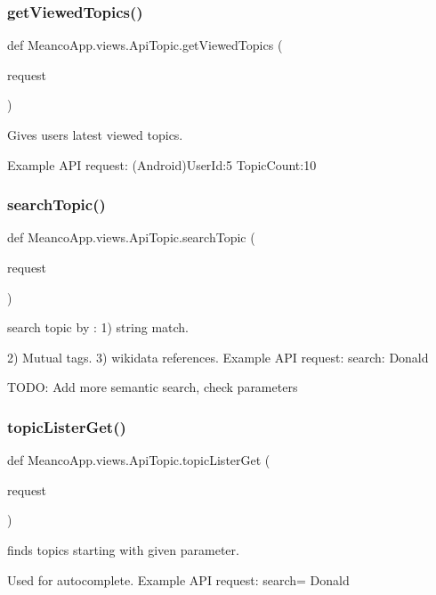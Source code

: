 \subsubsection{\texorpdfstring{get\+Viewed\+Topics()}{getViewedTopics()}}
{\footnotesize\ttfamily def Meanco\+App.\+views.\+Api\+Topic.\+get\+Viewed\+Topics (\begin{DoxyParamCaption}\item[{}]{request }\end{DoxyParamCaption})}



Gives users latest viewed topics. 

Example A\+PI request\+: (Android)User\+Id\+:5 Topic\+Count\+:10 \hypertarget{namespace_meanco_app_1_1views_1_1_api_topic_a7d468b816bae096de9590c7c517eed4c}{}\label{namespace_meanco_app_1_1views_1_1_api_topic_a7d468b816bae096de9590c7c517eed4c} 
\subsubsection{\texorpdfstring{search\+Topic()}{searchTopic()}}
{\footnotesize\ttfamily def Meanco\+App.\+views.\+Api\+Topic.\+search\+Topic (\begin{DoxyParamCaption}\item[{}]{request }\end{DoxyParamCaption})}



search topic by \+: 1) string match. 

2) Mutual tags. 3) wikidata references. Example A\+PI request\+: search\+: Donald

T\+O\+DO\+: Add more semantic search, check parameters \hypertarget{namespace_meanco_app_1_1views_1_1_api_topic_ac2330605dba8bd984d16fd10596e1b40}{}\label{namespace_meanco_app_1_1views_1_1_api_topic_ac2330605dba8bd984d16fd10596e1b40} 
\subsubsection{\texorpdfstring{topic\+Lister\+Get()}{topicListerGet()}}
{\footnotesize\ttfamily def Meanco\+App.\+views.\+Api\+Topic.\+topic\+Lister\+Get (\begin{DoxyParamCaption}\item[{}]{request }\end{DoxyParamCaption})}



finds topics starting with given parameter. 

Used for autocomplete. Example A\+PI request\+: search= Donald 